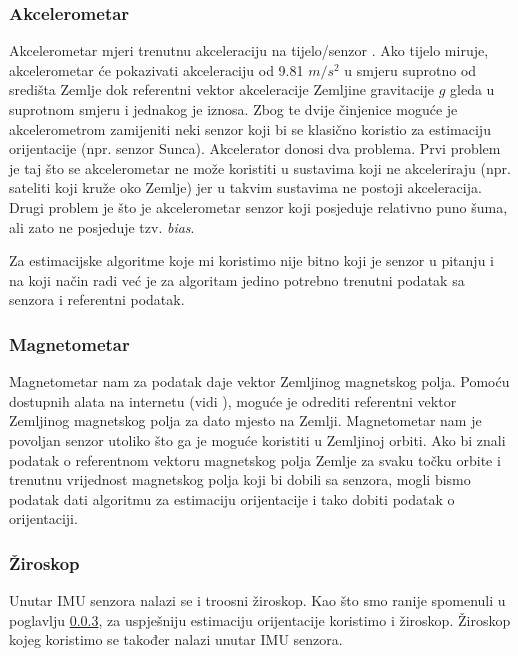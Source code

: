 \documentclass[times, utf8, diplomski, numeric]{templates/template}
\begin{document}
{{{            \subsubsection{Akcelerometar}{
                Akcelerometar mjeri trenutnu akceleraciju na tijelo/senzor \cite{}. Ako tijelo miruje, akcelerometar će pokazivati akceleraciju od 9.81 $m/s^2$ u smjeru suprotno od središta Zemlje dok referentni vektor akceleracije Zemljine gravitacije $g$ gleda u suprotnom smjeru i jednakog je iznosa. Zbog te dvije činjenice moguće je akcelerometrom zamijeniti neki senzor koji bi se klasično koristio za estimaciju orijentacije (npr. senzor Sunca). Akcelerator donosi dva problema. Prvi problem je taj što se akcelerometar ne može koristiti u sustavima koji ne akceleriraju (npr. sateliti koji kruže oko Zemlje) jer u takvim sustavima ne postoji akceleracija. Drugi problem je što je akcelerometar senzor koji posjeduje relativno puno šuma, ali zato ne posjeduje tzv. \emph{bias}. 

                Za estimacijske algoritme koje mi koristimo nije bitno koji je senzor u pitanju i na koji način radi već je za algoritam jedino potrebno trenutni podatak sa senzora i referentni podatak. 
            }

            \subsubsection{Magnetometar}{
                Magnetometar nam za podatak daje vektor Zemljinog magnetskog polja. Pomoću dostupnih alata na internetu (vidi \cite{magnetic_model}), moguće je odrediti referentni vektor Zemljinog magnetskog polja za dato mjesto na Zemlji. Magnetometar nam je povoljan senzor utoliko što ga je moguće koristiti u Zemljinoj orbiti. Ako bi znali podatak o referentnom vektoru magnetskog polja Zemlje za svaku točku orbite i trenutnu vrijednost magnetskog polja koji bi dobili sa senzora, mogli bismo podatak dati algoritmu za estimaciju orijentacije i tako dobiti podatak o orijentaciji.
            }

            \subsubsection{Žiroskop}{
                Unutar IMU senzora nalazi se i troosni žiroskop. Kao što smo ranije spomenuli u poglavlju \ref{}, za uspješniju estimaciju orijentacije koristimo i žiroskop. Žiroskop kojeg koristimo se također nalazi unutar IMU senzora.
            }

}}}
\end{document}
